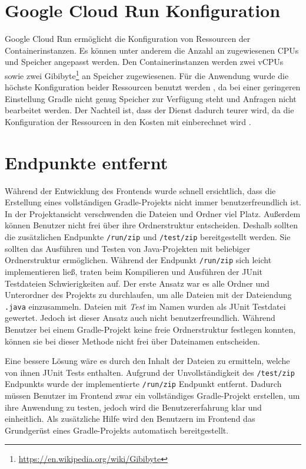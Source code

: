 \section{Google Cloud Run Konfiguration}
Google Cloud Run ermöglicht die Konfiguration von Ressourcen der
Containerinstanzen. Es können unter anderem die Anzahl an zugewiesenen CPUs \cite{CloudRunCpuAlloc} und
Speicher \cite{CloudRunMemLimits} angepasst werden.
Den Containerinstanzen werden zwei vCPUs sowie zwei Gibibyte\footnote{\url{https://en.wikipedia.org/wiki/Gibibyte}}
an Speicher zugewiesenen. Für die Anwendung wurde die höchste Konfiguration beider
Ressourcen benutzt werden \cite{CloudRunCpuAlloc} \cite{CloudRunMemLimits},
da bei einer geringeren Einstellung Gradle nicht genug Speicher zur Verfügung
steht und Anfragen nicht bearbeitet werden. Der Nachteil ist, dass der Dienst dadurch
teurer wird, da die Konfiguration der Ressourcen in den Kosten mit einberechnet wird \cite{CloudRunPricing}.

\section{Endpunkte entfernt}
Während der Entwicklung des Frontends wurde schnell ersichtlich,
dass die Erstellung eines vollständigen Gradle-Projekts nicht immer benutzerfreundlich ist.
In der Projektansicht verschwenden die Dateien und Ordner viel Platz.
Außerdem können Benutzer nicht frei über ihre Ordnerstruktur entscheiden.
Deshalb sollten die zusätzlichen Endpunkte \texttt{/run/zip} und \texttt{/test/zip}
bereitgestellt werden. Sie sollten das Ausführen und Testen von Java-Projekten mit
beliebiger Ordnerstruktur ermöglichen.
Während der Endpunkt \texttt{/run/zip} sich leicht implementieren ließ, traten
beim Kompilieren und Ausführen der JUnit Testdateien Schwierigkeiten auf.
Der erste Ansatz war es alle Ordner und Unterordner des Projekts zu
durchlaufen, um alle Dateien mit der Dateiendung \texttt{.java} einzusammeln.
Dateien mit \emph{Test} im Namen wurden als JUnit Testdatei gewertet. Jedoch
ist dieser Ansatz auch nicht benutzerfreundlich. Während Benutzer
bei einem Gradle-Projekt keine freie Ordnerstruktur festlegen konnten,
können sie bei dieser Methode nicht frei über Dateinamen entscheiden.

Eine bessere Lösung wäre es durch den Inhalt der Dateien zu ermitteln,
welche von ihnen JUnit Tests enthalten. Aufgrund der Unvollständigkeit
des \texttt{/test/zip} Endpunkts wurde der implementierte
\texttt{/run/zip} Endpunkt entfernt. Dadurch müssen Benutzer im
Frontend zwar ein vollständiges Gradle-Projekt erstellen,
um ihre Anwendung zu testen,
jedoch wird die Benutzererfahrung klar und einheitlich.
Als zusätzliche Hilfe wird den Benutzern im Frontend das Grundgerüst eines Gradle-Projekts
automatisch bereitgestellt.


